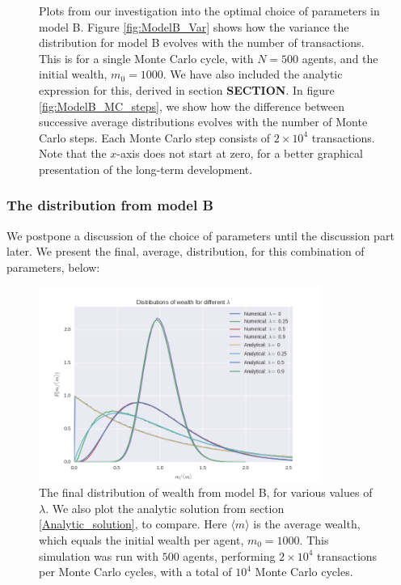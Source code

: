 \documentclass[a4paper, 10pt]{article}
\begin{document}
\begin{figure}[!ht]
    \caption{Plots from our investigation into the optimal choice of parameters in model B. Figure \ref{fig:ModelB_Var} shows how the variance the distribution for model B evolves with the number of transactions. This is for a single Monte Carlo cycle, with $N=500$ agents, and the initial wealth, $m_0=1000$. We have also included the analytic expression for this, derived in section \textbf{SECTION}. In figure \ref{fig:ModelB_MC_steps}, we show how the difference between successive average distributions evolves with the number of Monte Carlo steps. Each Monte Carlo step consists of $2\times 10^4$ transactions. Note that the $x$-axis does not start at zero, for a better graphical presentation of the long-term development.}\label{fig:ModelB}
\end{figure} %
\subsubsection{The distribution from model B}
We postpone a discussion of the choice of parameters until the discussion part later. We present the final, average, distribution, for this combination of parameters, below:
\begin{figure}[!ht]
\centering
\includegraphics[height=2.5in]{distDiffLamb.png} %
\caption{The final distribution of wealth from model B, for various values of $\lambda$. We also plot the analytic solution from section \ref{Analytic_solution}, to compare. Here $\langle m \rangle$ is the average wealth, which equals the initial wealth per agent, $m_0=1000$. This simulation was run with $500$ agents, performing $2\times 10^4$ transactions per Monte Carlo cycles, with a total of $10^4$ Monte Carlo cycles.}\label{fig:ModelB_final_distribution}
\end{figure}
\end{document}
